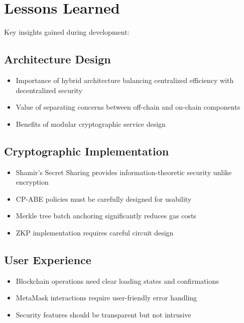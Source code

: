 \documentclass[12pt]{report}
\theoremstyle{plain}
\theoremstyle{definition}
\theoremstyle{remark}
\begin{document}
\section{Lessons Learned}

Key insights gained during development:

\subsection{Architecture Design}

\begin{itemize}
    \item Importance of hybrid architecture balancing centralized efficiency with decentralized security
    \item Value of separating concerns between off-chain and on-chain components
    \item Benefits of modular cryptographic service design
\end{itemize}

\subsection{Cryptographic Implementation}

\begin{itemize}
    \item Shamir's Secret Sharing provides information-theoretic security unlike encryption
    \item CP-ABE policies must be carefully designed for usability
    \item Merkle tree batch anchoring significantly reduces gas costs
    \item ZKP implementation requires careful circuit design
\end{itemize}

\subsection{User Experience}

\begin{itemize}
    \item Blockchain operations need clear loading states and confirmations
    \item MetaMask interactions require user-friendly error handling
    \item Security features should be transparent but not intrusive
\end{itemize}
\end{document}
